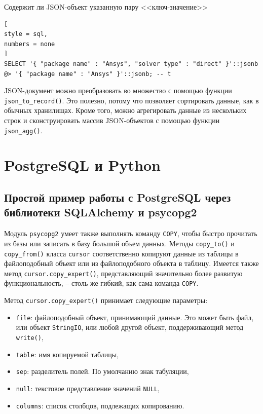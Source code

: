 \documentclass[%
	11pt,
	a4paper,
	utf8,
		]{article}
\begin{document}
Содержит ли JSON-объект указанную пару <<ключ-значение>>
\begin{lstlisting}[
style = sql,
numbers = none
]
SELECT '{ "package name" : "Ansys", "solver type" : "direct" }'::jsonb @> '{ "package name" : "Ansys" }'::jsonb; -- t
\end{lstlisting}

JSON-документ можно преобразовать во множество с помощью функции \texttt{json\_to\_record()}. Это полезно, потому что позволяет сортировать данные, как в обычных хранилищах. Кроме того, можно агрегировать данные из нескольких строк и сконструировать массив JSON-объектов с помощью функции \texttt{json\_agg()}.


\section{PostgreSQL и Python}

\subsection{Простой пример работы с PostgreSQL через библиотеки SQLAlchemy и psycopg2}

Модуль \texttt{psycopg2} умеет также выполнять команду \texttt{COPY}, чтобы быстро прочитать из базы или записать в базу большой объем данных. Методы \verb|copy_to()| и \verb|copy_from()| класса \texttt{cursor} соответственно копируют данные из таблицы в файлоподобный объект или из файлоподобного объекта в таблицу. Имеется также метод \texttt{cursor.copy\_expert()}, представляющий значительно более развитую функциональность, -- столь же гибкий, как сама команда \texttt{COPY}.

Метод \texttt{cursor.copy\_expert()} принимает следующие параметры:
\begin{itemize}
	\item \texttt{file}: файлоподобный объект, принимающий данные. Это может быть файл, или объект \texttt{StringIO}, или любой другой объект, поддерживающий метод \texttt{write()},
	
	\item \texttt{table}: имя копируемой таблицы,
	
	\item \texttt{sep}: разделитель полей. По умолчанию знак табуляции,
	
	\item \texttt{null}: текстовое представление значений \texttt{NULL},
	
	\item \texttt{columns}: список столбцов, подлежащих копированию.
\end{itemize}
\end{document}
